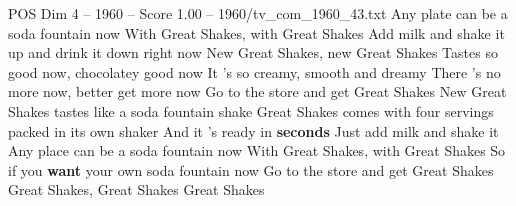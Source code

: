 \begin{textsample}{POS Dim 4 – 1960 – Score 1.00 – 1960/tv\_com\_1960\_43.txt}  \label{ex:f4_pos_017}
Any plate can be a soda fountain now With Great Shakes, with Great Shakes Add milk and shake it up and drink it down right now New Great Shakes, new Great Shakes Tastes so good now, chocolatey good now It 's so creamy, smooth and dreamy There 's no more now, better get more now Go to the store and get Great Shakes New Great Shakes tastes like a soda fountain shake Great Shakes comes with four servings packed in its own shaker And it 's ready in \textbf{seconds} Just add milk and shake it Any place can be a soda fountain now With Great Shakes, with Great Shakes So if you \textbf{want} your own soda fountain now Go to the store and get Great Shakes Great Shakes, Great Shakes Great Shakes

\end{textsample}
